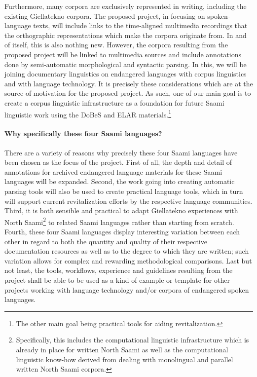 \documentclass[a4paper,12pt]{article}
\begin{document}
Furthermore, many corpora are exclusively represented in writing, including the existing Giellatekno corpora. The proposed project, in focusing on spoken-language texts, will include links to the time-aligned multimedia recordings that the orthographic representations which make the corpora originate from. In and of itself, this is also nothing new. However, the corpora resulting from the proposed project will be linked to multimedia sources and include annotations done by semi-automatic morphological and syntactic parsing. In this, we will be joining documentary linguistics on endangered languages with corpus linguistics and with language technology. It is precisely these considerations which are at the source of motivation for the proposed project. As such, one of our main goal is to create a corpus linguistic infrastructure as a foundation for future Saami linguistic work using the DoBeS and ELAR materials.\footnote{The other main goal being practical tools for aiding revitalization.}

\paragraph{Why specifically these four Saami languages?}
There are a variety of reasons why precisely these four Saami languages have been chosen as the focus of the project. First of all, the depth and detail of annotations for archived endangered language materials for these Saami languages will be expanded. Second, the work going into creating automatic parsing tools will also be used to create practical language tools, which in turn will support current revitalization efforts by the respective language communities. Third, it is both sensible and practical to adapt Giellatekno experiences with North Saami\footnote{Specifically, this includes the computational linguistic infrastructure which is already in place for written North Saami as well as the computational linguistic know-how derived from dealing with monolingual and parallel written North Saami corpora.} to related Saami languages rather than starting from scratch. Fourth, these four Saami languages display interesting variation between each other in regard to both the quantity and quality of their respective documentation resources as well as to the degree to which they are written; such variation allows for complex and rewarding methodological comparisons. Last but not least, the tools, workflows, experience and guidelines resulting from the project shall be able to be used as a kind of example or template for other projects working with language technology and/or corpora of endangered spoken languages.
\end{document}
